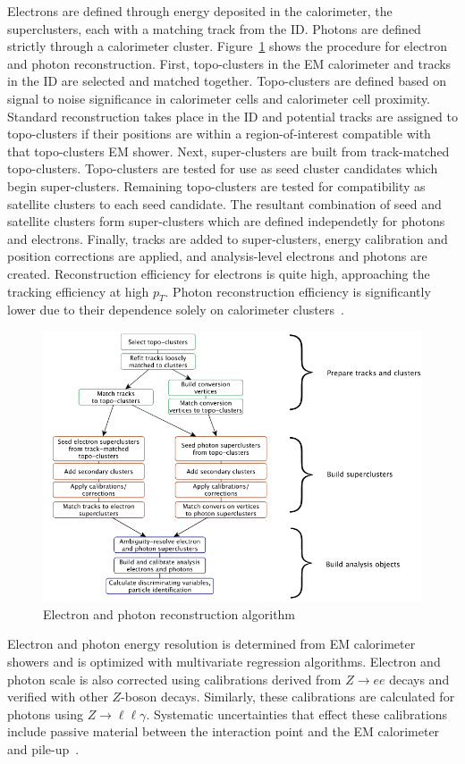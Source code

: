 Electrons are defined through energy deposited in the calorimeter, the superclusters, each with a matching track from the ID. Photons are defined strictly through a calorimeter cluster. Figure~\ref{fig:ElectroReco} shows the procedure for electron and photon reconstruction. First, topo-clusters in the EM calorimeter and tracks in the ID are selected and matched together. Topo-clusters are defined based on signal to noise significance in calorimeter cells and calorimeter cell proximity. Standard reconstruction takes place in the ID and potential tracks are assigned to topo-clusters if their positions are within a region-of-interest compatible with that topo-clusters EM shower. Next, super-clusters are built from track-matched topo-clusters. Topo-clusters are tested for use as seed cluster candidates which begin super-clusters. Remaining topo-clusters are tested for compatibility as satellite clusters to each seed candidate. The resultant combination of seed and satellite clusters form super-clusters which are defined independetly for photons and electrons.  Finally, tracks are added to super-clusters, energy calibration and position corrections are applied, and analysis-level electrons and photons are created. Reconstruction efficiency for electrons is quite high, approaching the tracking efficiency at high $p_T$. Photon reconstruction efficiency is significantly lower due to their dependence solely on calorimeter clusters~\cite{ElectronPhotonPerformance}. 

\begin{figure}[!h]
        \centering
    \includegraphics[width=.6\textwidth]{Pictures/ElectroReco.png}
    \caption{ Electron and photon reconstruction algorithm~\cite{ElectronPhotonPerformance}}
    \label{fig:ElectroReco}
\end{figure}
 
Electron and photon energy resolution is determined from EM calorimeter showers and is optimized with multivariate regression algorithms. Electron and photon scale is also corrected using calibrations derived from $Z\rightarrow ee$ decays and verified with other $Z$-boson decays. Similarly, these calibrations are calculated for photons using $Z\rightarrow \ell\ell\gamma$. Systematic uncertainties that effect these calibrations include passive material between the interaction point and the EM calorimeter and pile-up~\cite{ElectronPhotonPerformance}. 

